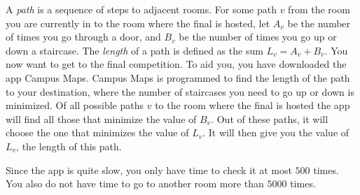 A \emph{path} is a sequence of steps to adjacent rooms.
For some path $v$ from the room you are currently in to the room where the final is hosted,
let $A_v$ be the number of times you go through a door,
and $B_v$ be the number of times you go up or down a staircase.
The \emph{length} of a path is defined as the sum $L_v = A_v + B_v$.
You now want to get to the final competition. 
To aid you, you have downloaded the app Campus Maps.
Campus Maps is programmed to find the length of the path to your destination,
where the number of staircases you need to go up or down is minimized.
Of all possible paths $v$ to the room where the final is hosted the app will find all those that minimize the value of $B_v$.
Out of these paths, it will choose the one that minimizes the value of $L_v$.
It will then give you the value of $L_v$, the length of this path. 

Since the app is quite slow, you only have time to check it at most $500$ times.
You also do not have time to go to another room more than $5000$ times.


